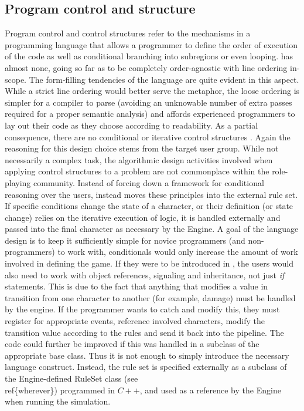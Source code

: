\subsection{Program control and structure}
Program control and control structures refer to the mechanisms in a programming language that allows a programmer to define the order of execution of the code as well as conditional branching into subregions or even looping. \langname{} has almost none, going so far as to be completely order-agnostic with line ordering in-scope. 
The form-filling tendencies of the language are quite evident in this aspect. While a strict line ordering would better serve the metaphor, the loose ordering is simpler for a compiler to parse (avoiding an unknowable number of extra passes required for a proper semantic analysis) and affords experienced programmers to lay out their code as they choose according to readability. As a partial consequence, there are no conditional or iterative control structures .
Again the reasoning for this design choice stems from the target user group. While not necessarily a complex task, the algorithmic design activities involved when applying control structures to a problem are not commonplace within the role-playing community. Instead of forcing down a framework for conditional reasoning over the users, \langname{} instead moves these principles into the external rule set. If specific conditions change the state of a character, or their definition (or state change) relies on the iterative execution of logic, it is handled externally and passed into the final character as necessary by the Engine. A goal of the language design is to keep it sufficiently simple for novice programmers (and non-programmers) to work with, conditionals would only increase the amount of work involved in defining the game. If they were to be introduced in \langname{}, the users would also need to work with object references, signaling and inheritance, not just \emph{if} statements. This is due to the fact that anything that modifies a value in transition from one character to another (for example, damage) must be handled by the engine. If the programmer wants to catch and modify this, they must register for appropriate events, reference involved characters, modify the transition value according to the rules and send it back into the pipeline. The code could further be improved if this was handled in a subclass of the appropriate \langname{} base class. Thus it is not enough to simply introduce the necessary language construct.
Instead, the rule set is specified externally as a subclass of the Engine-defined RuleSet class  (see \\ref\{wherever\}) programmed in $C++$, and used as a reference by the Engine when running the simulation.
